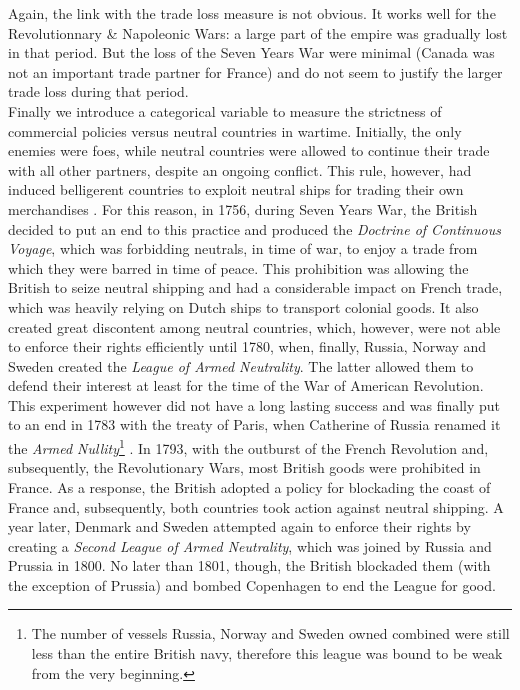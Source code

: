 \documentclass[12pt,a4paper,notitlepage,english]{article}
\begin{document}
Again, the link with the trade loss measure is not obvious. It works well for the Revolutionnary \& Napoleonic Wars: a large part of the empire was gradually lost in that period. But the loss of the Seven Years War were minimal (Canada was not an important trade partner for France) and do not seem to justify the larger trade loss during that period.\\
Finally we introduce a categorical variable to measure the strictness of commercial policies versus neutral countries in wartime.
Initially, the only enemies were foes, while neutral countries were allowed to continue their trade with all other partners, despite an ongoing conflict.
This rule, however, had induced belligerent countries to exploit neutral ships for trading their own merchandises \citep{carriere1973negociants}.
For this reason, in 1756, during Seven Years War, the British decided to put an end to this practice and produced the \textit{Doctrine of Continuous Voyage}, which was forbidding neutrals, in time of war, to enjoy a trade from which they were barred in time of peace.
This prohibition was allowing the British to seize neutral shipping and had a considerable impact on French trade, which was heavily relying on Dutch ships to transport colonial goods.
It also created great discontent among neutral countries, which, however, were not able to enforce their rights efficiently until 1780, when, finally, Russia, Norway and Sweden created the \textit{League of Armed Neutrality}.
The latter allowed them to defend their interest at least for the time of the War of American Revolution.
This experiment however did not have a long lasting success and was finally put to an end in 1783 with the treaty of Paris, when Catherine of Russia renamed it the \textit{Armed Nullity}\footnote{The number of vessels Russia, Norway and Sweden owned combined were still less than the entire British navy, therefore this league was bound to be weak from the very beginning.} \citep{griffiths1971american}.
In 1793, with the outburst of the French Revolution and, subsequently, the Revolutionary Wars, most British goods were prohibited in France.
As a response, the British adopted a policy for blockading the coast of France and, subsequently, both countries took action against neutral shipping.
A year later, Denmark and Sweden attempted again to enforce their rights by creating a \textit{Second League of Armed Neutrality}, which was joined by Russia and Prussia in 1800.
No later than 1801, though, the British blockaded them (with the exception of Prussia) and bombed Copenhagen to end the League for good.
\end{document}
